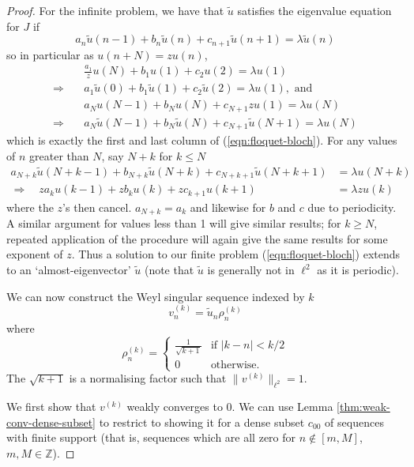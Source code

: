 \documentclass[../main.tex]{subfiles}
\begin{document}
\begin{proof} For the infinite problem, we have that $\tilde{u}$ satisfies
  the eigenvalue equation for $J$ if
  $$a_n \tilde{u}(n-1) + b_n \tilde{u}(n) + c_{n+1} \tilde{u}(n+1) = \lambda \tilde{u}(n)$$
so in particular as $u(n + N) = z u(n)$, 
\begin{align*}
  & \frac{a_1}{z} u(N) + b_1 u(1) + c_2 u(2) = \lambda u(1)\\
  \Rightarrow \quad& a_1 \tilde{u}(0) + b_1 \tilde{u}(1) + c_2 \tilde{u}(2) 
	    = \lambda u(1), \text{ and } \\
  & a_N u(N-1) + b_N u(N) + c_{N+1} z u(1) = \lambda u(N)\\
  \Rightarrow \quad& a_N \tilde{u}(N-1) + b_N \tilde{u}(N) + c_{N+1} \tilde{u}(N+1) 
            = \lambda u(N)
\end{align*}
which is exactly the first and last column of (\ref{eqn:floquet-bloch}). For any values of
$n$ greater than $N$, say $N + k$ for $k \leq N$ 
\begin{align*}
  a_{N+k} \tilde{u}(N+k-1) + b_{N+k} \tilde{u}(N+k) + c_{N+k+1} \tilde{u}(N+k+1)
    & = \lambda u(N+k) \\
  \Rightarrow \quad z a_{k} u(k-1) + z b_{k} u(k) + z c_{k+1} u(k+1) & = \lambda z u(k)
\end{align*} 
where the $z$'s then cancel. $a_{N+k} = a_{k}$ and likewise for $b$ and $c$ due to periodicity.
A similar argument for values less than 1 will give similar results; for $k \geq N$, repeated
application of the procedure will again give the same results for some exponent of $z$.
Thus a solution to our finite problem (\ref{eqn:floquet-bloch}) extends to an `almost-eigenvector'
$\tilde{u}$ (note that $\tilde{u}$ is generally not in $\ell^2$ as it is periodic).

We can now construct the Weyl singular sequence indexed by $k$
  $$v_n^{(k)} = {\tilde{u}_n} \rho_n^{(k)}$$
where 
  $$
  \rho_n^{(k)} =
  \begin{cases}
    \frac{1}{\sqrt{k+1}} & \text{if } |k-n| < k/2 \\
    0 & \text{otherwise.}
  \end{cases}
  $$
  The $\sqrt{k+1}$ is a normalising factor such that $\|v^{(k)}\|_{\ell^2} = 1$.

We first show that $v^{(k)}$ weakly converges to 0. We can use Lemma
\ref{thm:weak-conv-dense-subset} to restrict to showing it for a dense subset
$c_{00}$ of sequences with finite support (that is, sequences which are
all zero for $n \notin [m, M]$, $m, M \in \mathbb{Z}$).


\end{proof}
\end{document}
